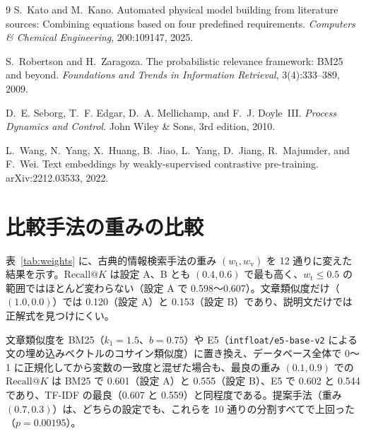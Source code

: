\documentclass[a4j,dvipdfmx,11pt]{jresume}
\makeatletter
\newcommand{\rk}{\textrm{Recall@}K}
\makeatother
\begin{document}
\begin{thebibliography}{9}
S.~Kato and M.~Kano.
\newblock Automated physical model building from literature sources: Combining equations based on four predefined requirements.
\newblock \emph{Computers \& Chemical Engineering}, 200:109147, 2025.

S.~Robertson and H.~Zaragoza.
\newblock The probabilistic relevance framework: BM25 and beyond.
\newblock \emph{Foundations and Trends in Information Retrieval}, 3(4):333--389, 2009.

D.~E. Seborg, T.~F. Edgar, D.~A. Mellichamp, and F.~J. Doyle~III.
\newblock \emph{Process Dynamics and Control}.
\newblock John Wiley \& Sons, 3rd edition, 2010.

L.~Wang, N.~Yang, X.~Huang, B.~Jiao, L.~Yang, D.~Jiang, R.~Majumder, and F.~Wei.
\newblock Text embeddings by weakly-supervised contrastive pre-training.
\newblock arXiv:2212.03533, 2022.
\end{thebibliography}

\appendix
\def\thesection{付録 \Alph{section}}
\section{比較手法の重みの比較}\label{app:weights}
表~\ref{tab:weights} に、古典的情報検索手法の重み $(w_{\mathrm{t}}, w_{\mathrm{v}})$ を 12 通りに変えた結果を示す。$\rk$ は設定 A、B とも $(0.4, 0.6)$ で最も高く、$w_{\mathrm{t}} \le 0.5$ の範囲ではほとんど変わらない（設定 A で 0.598〜0.607）。文章類似度だけ（$(1.0, 0.0)$）では 0.120（設定 A）と 0.153（設定 B）であり、説明文だけでは正解式を見つけにくい。

文章類似度を BM25（$k_1 = 1.5$、$b = 0.75$）や E5（\texttt{intfloat/e5-base-v2} による文の埋め込みベクトルのコサイン類似度）に置き換え、データベース全体で 0〜1 に正規化してから変数の一致度と混ぜた場合も、最良の重み $(0.1, 0.9)$ での $\rk$ は BM25 で 0.601（設定 A）と 0.555（設定 B）、E5 で 0.602 と 0.544 であり、TF-IDF の最良（0.607 と 0.559）と同程度である。提案手法（重み $(0.7, 0.3)$）は、どちらの設定でも、これらを 10 通りの分割すべてで上回った（$p = 0.00195$）。
\end{document}
